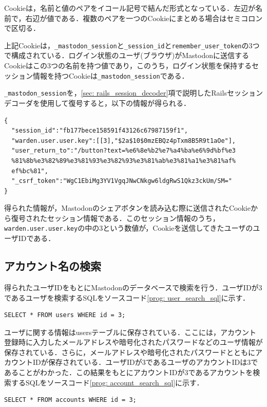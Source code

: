 \documentclass[10pt, a4paper]{jreport}
\begin{document}
Cookieは，名前と値のペアをイコール記号で結んだ形式となっている．左辺が名前で，右辺が値である．複数のペアを一つのCookieにまとめる場合はセミコロンで区切る．

上記Cookieは，\verb|_mastodon_session|と\verb|_session_id|と\verb|remember_user_token|の3つで構成されている．ログイン状態のユーザ(ブラウザ)がMastodonに送信するCookieはこの3つの名前を持つ値であり，このうち，ログイン状態を保持するセッション情報を持つCookieは\verb|_mastodon_session|である．

\verb|_mastodon_session|を，\ref{sec: rails_session_decoder}項で説明したRailsセッションデコーダを使用して復号すると，以下の情報が得られる．

\begin{verbatim}
{
  "session_id":"fb177bece158591f43126c67987159f1",
  "warden.user.user.key":[[3],"$2a$10$0mzEBQz4pTxm8B5R9t1aOe"],
  "user_return_to":"/button?text=%e6%8e%b2%e7%a4%ba%e6%9d%bf%e3
  %81%8b%e3%82%89%e3%81%93%e3%82%93%e3%81%ab%e3%81%a1%e3%81%af%
  ef%bc%81",
  "_csrf_token":"WgC1EbiMg3YV1VgqJNwCNkgw6ldgRwS1Qkz3ckUm/SM="
}
\end{verbatim}

得られた情報が，Mastodonのシェアボタンを読み込む際に送信されたCookieから復号されたセッション情報である．このセッション情報のうち，\verb|warden.user.user.key|の中の3という数値が，Cookieを送信してきたユーザのユーザIDである．

\subsection{アカウント名の検索}
得られたユーザIDをもとにMastodonのデータベースで検索を行う．ユーザIDが3であるユーザを検索するSQLをソースコード\ref{prog: user_search_sql}に示す．

\begin{lstlisting}[caption=ユーザIDが3であるユーザを検索するSQL,label=prog: user_search_sql]
SELECT * FROM users WHERE id = 3;
\end{lstlisting}

ユーザに関する情報はusersテーブルに保存されている．ここには，アカウント登録時に入力したメールアドレスや暗号化されたパスワードなどのユーザ情報が保存されている．さらに，メールアドレスや暗号化されたパスワードとともにアカウントIDが保存されている．ユーザIDが3であるユーザのアカウントIDは3であることがわかった．この結果をもとにアカウントIDが3であるアカウントを検索するSQLをソースコード\ref{prog: account_search_sql}に示す．

\begin{lstlisting}[caption=アカウントIDが3であるアカウントを検索するSQL,label=prog: account_search_sql]
SELECT * FROM accounts WHERE id = 3;
\end{lstlisting}
\end{document}
